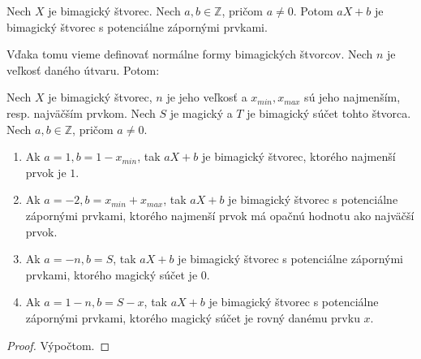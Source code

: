\begin{consequence} Nech $X$ je bimagický štvorec. Nech $a,b \in \mathbb{Z}$, pričom $a \neq 0$. Potom $aX + b$ je bimagický štvorec s potenciálne zápornými prvkami.
\end{consequence}

Vďaka tomu vieme definovať normálne formy bimagických štvorcov. Nech $n$ je veľkosť daného útvaru. Potom:

\begin{theorem}
\label{5x5bimagic1}
Nech $X$ je bimagický štvorec, $n$ je jeho veľkosť a $x_{min}, x_{max}$ sú jeho najmenším, resp. najväčším prvkom. Nech $S$ je magický a $T$ je bimagický súčet tohto štvorca. Nech $a,b \in \mathbb{Z}$, pričom $a \neq 0$.
\begin{enumerate}
\item Ak $a = 1, b = 1 - x_{min}$, tak $aX+b$ je bimagický štvorec, ktorého najmenší prvok je $1$.
\item Ak $a = -2, b = x_{min} + x_{max}$, tak $aX+b$ je bimagický štvorec s potenciálne zápornými prvkami, ktorého najmenší prvok má opačnú hodnotu ako najväčší prvok.
\item Ak $a = -n, b = S$, tak $aX+b$ je bimagický štvorec s potenciálne zápornými prvkami, ktorého magický súčet je $0$.
\item Ak $a = 1-n, b = S-x$, tak $aX+b$ je bimagický štvorec s potenciálne zápornými prvkami, ktorého magický súčet je rovný danému prvku $x$.
\end{enumerate}
\end{theorem}

\begin{proof}
Výpočtom.
\end{proof}


